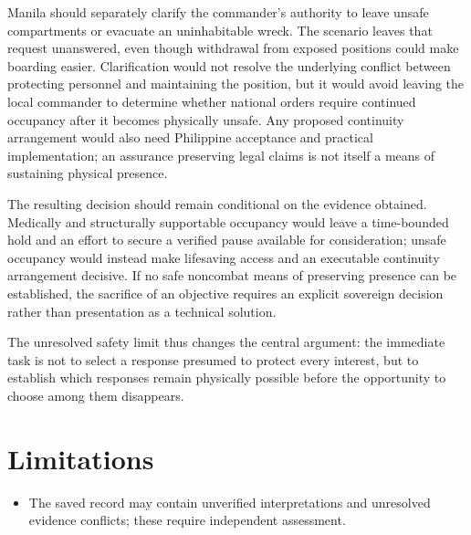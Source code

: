 \documentclass[11pt]{article}
\begin{document}
Manila should separately clarify the commander's authority to leave unsafe compartments or evacuate an uninhabitable wreck. The scenario leaves that request unanswered, even though withdrawal from exposed positions could make boarding easier. Clarification would not resolve the underlying conflict between protecting personnel and maintaining the position, but it would avoid leaving the local commander to determine whether national orders require continued occupancy after it becomes physically unsafe. Any proposed continuity arrangement would also need Philippine acceptance and practical implementation; an assurance preserving legal claims is not itself a means of sustaining physical presence.

The resulting decision should remain conditional on the evidence obtained. Medically and structurally supportable occupancy would leave a time-bounded hold and an effort to secure a verified pause available for consideration; unsafe occupancy would instead make lifesaving access and an executable continuity arrangement decisive. If no safe noncombat means of preserving presence can be established, the sacrifice of an objective requires an explicit sovereign decision rather than presentation as a technical solution.

The unresolved safety limit thus changes the central argument: the immediate task is not to select a response presumed to protect every interest, but to establish which responses remain physically possible before the opportunity to choose among them disappears.

\section{Limitations}
\begin{itemize}
\item The saved record may contain unverified interpretations and unresolved evidence conflicts; these require independent assessment.
\end{itemize}
\end{document}
